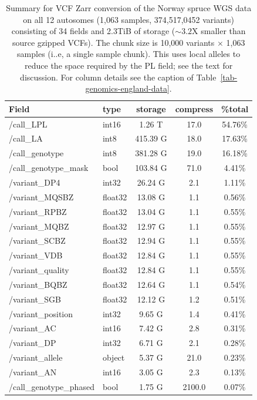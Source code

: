\documentclass[a4paper,num-refs]{oup-contemporary}
\begin{document}
\begin{table}
\caption{Summary for VCF Zarr conversion of the Norway spruce
WGS data on all 12 autosomes (1,063 samples, 374,517,0452 variants)
consisting of 34 fields and 2.3TiB of storage ($\sim 3.2$X smaller 
than source gzipped VCFs). The chunk size is 10,000 variants $\times$
1,063 samples (i..e, a single sample chunk). This uses local 
alleles to reduce the 
space required by the PL field; see the text for discussion.
For column details see the caption of
Table~\ref{tab-genomics-england-data}.
\label{tab-spruce-data}}

\begin{tabular}{llS[table-format=3.2]S[table-format=3.2]S[table-format=3.2]}
\toprule
{Field} & {type} & {storage} & {compress} & {\%total} \\
\midrule
/call\_LPL & int16 & 1.26 T & 17.0 & 54.76\% \\
/call\_LA & int8 & 415.39 G & 18.0 & 17.63\% \\
/call\_genotype & int8 & 381.28 G & 19.0 & 16.18\% \\
/call\_genotype\_mask & bool & 103.84 G & 71.0 & 4.41\% \\
/variant\_DP4 & int32 & 26.24 G & 2.1 & 1.11\% \\
/variant\_MQSBZ & float32 & 13.08 G & 1.1 & 0.56\% \\
/variant\_RPBZ & float32 & 13.04 G & 1.1 & 0.55\% \\
/variant\_MQBZ & float32 & 12.97 G & 1.1 & 0.55\% \\
/variant\_SCBZ & float32 & 12.94 G & 1.1 & 0.55\% \\
/variant\_VDB & float32 & 12.84 G & 1.1 & 0.55\% \\
/variant\_quality & float32 & 12.84 G & 1.1 & 0.55\% \\
/variant\_BQBZ & float32 & 12.64 G & 1.1 & 0.54\% \\
/variant\_SGB & float32 & 12.12 G & 1.2 & 0.51\% \\
/variant\_position & int32 & 9.65 G & 1.4 & 0.41\% \\
/variant\_AC & int16 & 7.42 G & 2.8 & 0.31\% \\
/variant\_DP & int32 & 6.71 G & 2.1 & 0.28\% \\
/variant\_allele & object & 5.37 G & 21.0 & 0.23\% \\
/variant\_AN & int16 & 3.05 G & 2.3 & 0.13\% \\
/call\_genotype\_phased & bool & 1.75 G & 2100.0 & 0.07\% \\

\end{tabular}
\end{table}
\end{document}
